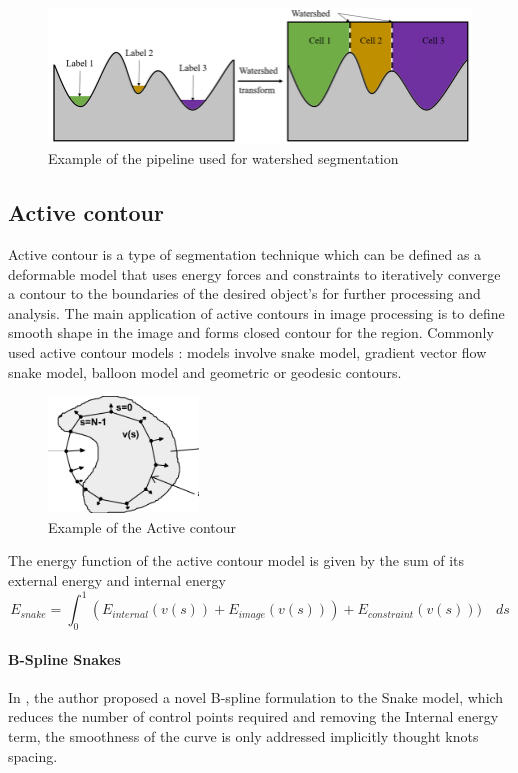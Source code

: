 \documentclass[main.tex]{subfiles}
\begin{document}
\begin{figure}[H]
    \centering
    \includegraphics[width=12cm]{images/watershed.png}
    \caption{Example of the pipeline used for watershed segmentation}
    \label{fig:watershed}
\end{figure}
\subsection{Active contour}

Active contour is a type of segmentation technique which can be defined as a deformable model that uses energy forces and constraints to iteratively converge a contour to the boundaries of the desired object's for further processing and analysis. The main application of active contours in image processing is to define smooth shape in the image and forms closed contour for the region. Commonly used active contour models : models involve snake model, gradient vector flow snake model, balloon model and geometric or geodesic contours.\cite{Bengtsson2004}

\begin{figure}[H]
    \centering
    \includegraphics[width=4cm]{images/ac.png}
    \caption{Example of the Active contour}
    \label{fig:ac}
\end{figure}

The energy function of the active contour model is given by the sum of its external energy and internal energy
\begin{equation}
    E_{\mathit{snake}} = \int_{0}^{1} (E_{\mathit{internal}}(v(s)) + E_{\mathit{image}}(v(s))) + E_{\mathit{constraint}}(v(s)))\quad ds
\end{equation}
\paragraph{B-Spline Snakes} In \cite{Brigger2000}, the author proposed a novel B-spline formulation to the Snake model, which reduces the number of control points required and removing the Internal energy term, the smoothness of the curve is only addressed implicitly thought knots spacing.
\end{document}
